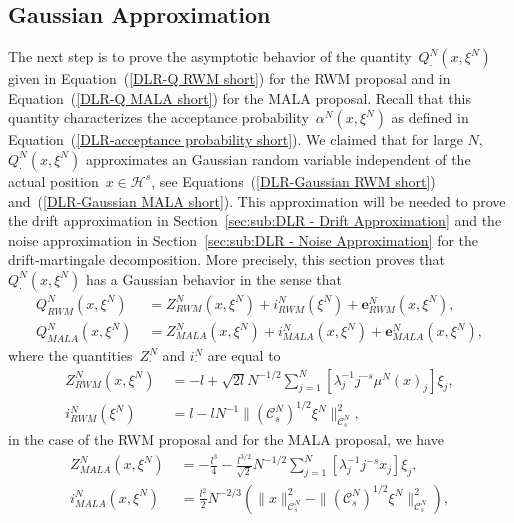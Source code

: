 \subsection{Gaussian Approximation}
\label{sec:sub:DLR - Gaussian approximation}

The next step is to prove the asymptotic behavior of the quantity~$Q^N_{\cdot}(x, \xi^N)$ given in Equation~(\ref{DLR-Q RWM short}) for the RWM proposal and in Equation~(\ref{DLR-Q MALA short}) for the MALA proposal. Recall that this quantity characterizes the acceptance probability~$\alpha^N(x, \xi^N)$ as defined in Equation~(\ref{DLR-acceptance probability short}). We claimed that for large $N$, $Q^N_{\cdot}(x, \xi^N)$ approximates an Gaussian random variable independent of the actual position~$x \in \mathcal{H}^s$, see Equations~(\ref{DLR-Gaussian RWM short}) and~(\ref{DLR-Gaussian MALA short}). This approximation will be needed to prove the drift approximation in Section~\ref{sec:sub:DLR - Drift Approximation} and the noise approximation in Section~\ref{sec:sub:DLR - Noise Approximation} for the drift-martingale decomposition. More precisely, this section proves that $Q^N_{\cdot}(x, \xi^N)$ has a Gaussian behavior in the sense that
\begin{align}
  \label{DLR-Definition Q^N_RWM as Gaussian}
 Q^N_{RWM}(x, \xi^N) & \; = Z^N_{RWM} (x, \xi^N) + i^N_{RWM}( \xi^N)+ \textbf{e}^N_{RWM}(x, \xi^N), \\
  \label{DLR-Definition Q^N_MALA as Gaussian}
 Q^N_{MALA}(x, \xi^N) & \; =  Z^N_{MALA} (x, \xi^N) + i^N_{MALA}(x, \xi^N) + \textbf{e}^N_{MALA}(x, \xi^N),
\end{align}
where the quantities~$Z^N_{\cdot}$ and $i^N_{\cdot}$ are equal to
\begin{align}
  Z^N_{RWM} (x, \xi^N) & \; = - l + \sqrt{2l} N^{-1/2} \sum_{j=1}^{N} \left[ \lambda_j^{-1} j^{-s} \mu^N(x)_j \right] \xi_j ,\\
  i^N_{RWM}( \xi^N) & \; = l  - l N^{-1} \|(\mathcal{C}^N_s)^{1/2} \xi^N \|_{\mathcal{C}^N_s}^2 ,
\end{align}
in the case of the RWM proposal and for the MALA proposal, we have
\begin{align}
  Z^N_{MALA} (x, \xi^N) & \; = -\frac{l^3}{4} - \frac{l^{3/2}}{\sqrt{2}} N^{-1/2} \sum_{j=1}^N  \left[ \lambda_j^{-1} j^{-s} x_j \right] \xi_j ,\\
  i^N_{MALA}(x, \xi^N) & \; =  \frac{l^2}{2} N^{-2/3} (\|x \|_{\mathcal{C}^N_s}^2 - \| (\mathcal{C}^N_s)^{1/2} \xi^N \|_{\mathcal{C}^N_s}^2) ,
\end{align}
